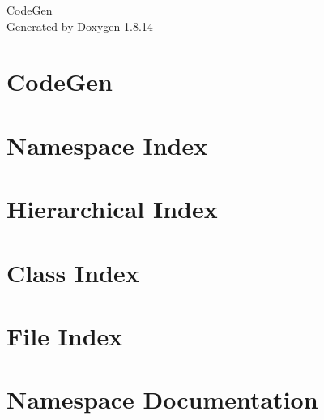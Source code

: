 \documentclass[twoside]{book}
\newcommand{\+}{\discretionary{\mbox{\scriptsize$\hookleftarrow$}}{}{}}
\newcommand{\clearemptydoublepage}{%
  \newpage{\pagestyle{empty}\cleardoublepage}%
}
\begin{document}
\hypersetup{pageanchor=false,
             bookmarksnumbered=true,
             pdfencoding=unicode
            }
\begin{titlepage}
\vspace*{7cm}
\begin{center}%
{\Large Code\+Gen }\\
\vspace*{1cm}
{\large Generated by Doxygen 1.8.14}\\
\end{center}
\end{titlepage}
\clearemptydoublepage
{}
\tableofcontents
\clearemptydoublepage
{}
\hypersetup{pageanchor=true}

\chapter{Code\+Gen}
\label{md_README}

\chapter{Namespace Index}

\chapter{Hierarchical Index}

\chapter{Class Index}

\chapter{File Index}

\chapter{Namespace Documentation}







\end{document}
